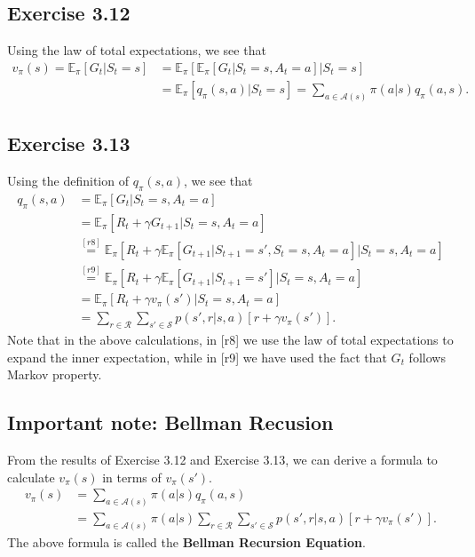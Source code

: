\documentclass[10pt]{article}
\begin{document}
	\subsection*{Exercise 3.12}
	\label{ss:3.12}
	Using the law of total expectations, we see that
	\begin{align*}
	v_{\pi}(s) = \mathbb{E}_{\pi} \left[ G_t | S_t = s \right] &= 
	\mathbb{E}_{\pi} \left[ \mathbb{E}_{\pi} \left[ G_t | S_t = s, A_t = a \right] | S_t = s \right]\\
	&= \mathbb{E}_{\pi} \left[ q_{\pi}(s,a) | S_t = s \right] = \sum_{a\in\mathcal{A}(s)} \pi(a|s)q_{\pi}(a,s).
	\end{align*}
	\subsection*{Exercise 3.13}
	\label{ss:3.13}
	Using the definition of $q_{\pi}(s,a)$, we see that
	\begin{align*}
	q_{\pi}(s,a) &= \mathbb{E}_\pi \left[ G_t | S_t = s, A_t = a \right] \\
	&= \mathbb{E}_\pi \left[ R_t + \gamma G_{t+1} | S_t = s, A_t = a \right] \\
	&\stackrel{[r8]}{=} \mathbb{E}_\pi \left[ R_t + \gamma \mathbb{E}_\pi \left[ G_{t+1} | S_{t+1} = s',S_t = s,A_t = a \right] | S_t = s, A_t = a \right]\\
	&\stackrel{[r9]}{=} \mathbb{E}_\pi\left[ R_t + \gamma \mathbb{E}_\pi \left[ G_{t+1} | S_{t+1} = s' \right] | S_t = s, A_t = a \right]\\
	&= \mathbb{E}_\pi \left[ R_t + \gamma v_{\pi} (s') | S_t = s, A_t = a \right]\\
	&= \sum_{r\in\mathcal{R}} \sum_{s'\in\mathcal{S}} p(s',r|s,a) \left[ r + \gamma v_{\pi} (s') \right].
	\end{align*}
	Note that in the above calculations, in [r8] we use the law of total expectations to expand the inner expectation, while in [r9] we have used the fact that $G_t$ follows Markov property.
	\subsection*{Important note: Bellman Recusion}
	\label{ss:bell-rec}
	From the results of Exercise 3.12 and Exercise 3.13, we can derive a formula to calculate $v_{\pi}(s)$ in terms of $v_{\pi}(s')$.
	\begin{align*}
	v_{\pi}(s) &= \sum_{a\in\mathcal{A}(s)} \pi(a|s)q_{\pi}(a,s)\\
	&= \sum_{a\in\mathcal{A}(s)} \pi(a|s)\sum_{r\in\mathcal{R}} \sum_{s'\in\mathcal{S}} p(s',r|s,a) \left[ r + \gamma v_{\pi} (s') \right].
	\end{align*} 
	The above formula is called the \textbf{Bellman Recursion Equation}.
\end{document}
